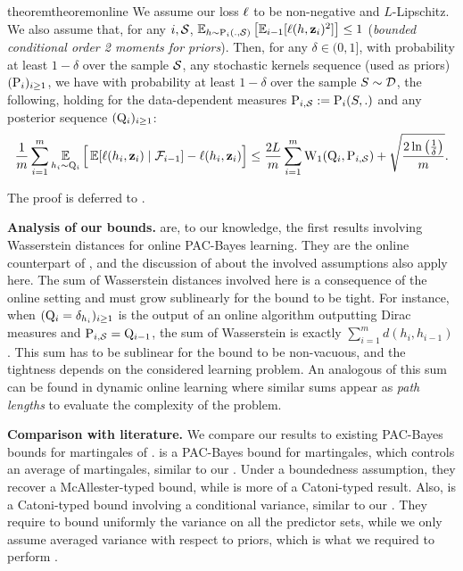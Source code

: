 \begin{restatable}{theorem}{theoremonline}
\label{theorem:online}
We assume our loss $\loss$ to be non-negative and $L$-Lipschitz.
We also assume that, for any $i,\S$, $\EE_{h\sim \P_{i}(.,\S)}\LB \EE_{i-1}[\loss(h,\z_i)^2] \RB \leq 1$ (\emph{bounded conditional order 2 moments for priors}).
Then, for any $\delta\in(0,1]$, with probability at least $1-\delta$ over the sample $\S$, any stochastic kernels sequence (used as priors) $(\P_i)_{i\geq 1}$, we have with probability at least $1-\delta$ over the sample $S\sim\D$, the following, holding for the data-dependent measures $\P_{i,\S}\defeq \P_i(S,.)$ and any posterior sequence $(\Q_i)_{i\geq 1}$:
\begin{align*}
\frac{1}{m}\sum_{i=1}^m \EE_{h_i\sim \Q_{i}} \Big[\EE[\loss(h_i,\z_i) \mid \Fcal_{i-1}] - \loss(h_i,\z_i) \Big]  \le \frac{2L}{m}\sum_{i=1}^{m}\W_{1}(\Q_{i}, \P_{i,\S}) + \sqrt{\frac{2\ln\LP\frac{1}{\delta}\RP}{m}}.
\end{align*}
\end{restatable}
The proof is deferred to .

\textbf{Analysis of our bounds.} 
 are, to our knowledge, the first results involving Wasserstein distances for online PAC-Bayes learning.
They are the online counterpart of , and the discussion of  about the involved assumptions also apply here.
The sum of Wasserstein distances involved here is a consequence of the online setting and must grow sublinearly for the bound to be tight.
For instance, when $(\Q_i=\delta_{h_i})_{i\geq1}$ is the output of an online algorithm outputting Dirac measures and $\P_{i,\S}= \Q_{i-1}$, the sum of Wasserstein is exactly $\sum_{i=1}^m d(h_i,h_{i-1})$.
This sum has to be sublinear for the bound to be non-vacuous, and the tightness depends on the considered learning problem. 
An analogous of this sum can be found in dynamic online learning \cite{zinkevich2003online} where similar sums appear as \emph{path lengths} to evaluate the complexity of the problem.  

\textbf{Comparison with literature.}
We compare our results to existing PAC-Bayes bounds for martingales of \cite{seldin2012pac}. 
\cite[Theorem 4]{seldin2012pac} is a PAC-Bayes bound for martingales, which controls an average of martingales, similar to our .
Under a boundedness assumption, they recover a McAllester-typed bound, while  is more of a Catoni-typed result.
Also, \cite[Theorem 7]{seldin2012pac} is a Catoni-typed bound involving a conditional variance, similar to our .
They require to bound uniformly the variance on all the predictor sets, while we only assume averaged variance with respect to priors, which is what we required to perform .

